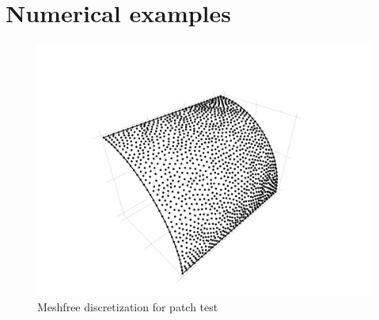 
\section{Numerical examples}
\begin{figure}[H]
    \centering
    \includegraphics[width=\textwidth]{figures/patchtest_msh}
    \caption{Meshfree discretization for patch test}

\end{figure}
